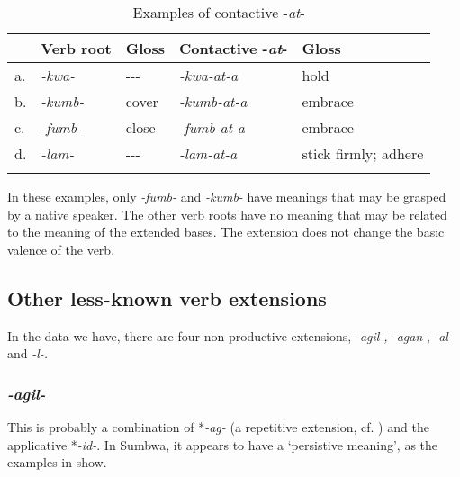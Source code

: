 \documentclass[output=paper		  ]{langscibook}
\begin{document}
\begin{table}
\begin{tabularx}{\textwidth}{lllll}

\lsptoprule
 & {{{{Verb} {root}}}} & {{{{Gloss}}}} & {{{{Contactive} {-\textit{at}-}}}} & Gloss\\
 \midrule
 {a.}& {\textit{{}-kwa-}} & {}-{}-{}- & {\itshape {}-kwa-at-a} & {{hold}}\\
 {b.}& {\textit{{}-kumb-}} & cover & {\itshape {}-kumb-at-a} & embrace\\
 {c.}& {\textit{{}-fumb-}} & close & {\itshape {}-fumb-at-a} & embrace\\
 {d.}& {\textit{{}-lam-}} & {}-{}-{}- & {\itshape {}-lam-at-a} & stick firmly; adhere\\
\lspbottomrule
\end{tabularx}
\caption{Examples of contactive -\textit{at}-}
\label{tabex:kahigi:38}
\end{table}

{In these examples, only} {\textit{{}-fumb-}} {and} {\textit{{}-kumb-}} {have meanings that may be grasped by a native speaker. The other verb roots have no meaning that may be related to the meaning of the extended bases. The extension does not change the basic valence of the verb.}

\subsection{Other less-known verb extensions}\label{sec:kahigi:2.15}

{In the data we have, there are four non-productive extensions,} {\textit{{}-agil-, -agan}}{{}-, -}{\textit{al-} }{and} {\textit{{}-l-.}}

\subsubsection{\textit{-agil-}}\label{sec:kahigi:2.15.1}

{This is probably a combination of *}{\textit{{}-ag-}} {(a repetitive}{ }{extension, cf. \citealt[96]{Schadeberg2003}) and the applicative *}{\textit{{}-id-}}. In Sumbwa, it appears to have a ‘persistive meaning’, as the  examples in  show.
\end{document}
